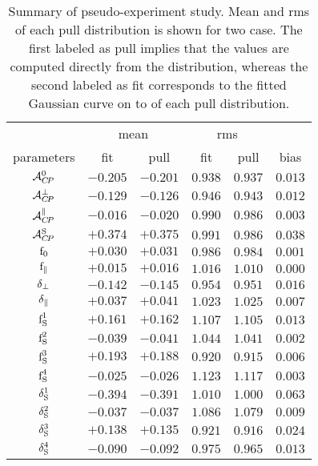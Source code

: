 \begin{table}[!t]
  \centering
  \footnotesize
  \begin{tabular}{c c c c c | c}
    \cline{2-5}
               & \multicolumn{2}{c}{mean} & \multicolumn{2}{c}{rms} &  \\
    \cline{2-6}
    parameters & fit & pull & fit & pull & bias \\
    \cline{1-6}
    $                  \mathcal{A}_{C\!P}^{0}$ & $-0.205$ & $-0.201$ & $0.938$ & $0.937$  & $0.013$ \\
    $              \mathcal{A}_{C\!P}^{\perp}$ & $-0.129$ & $-0.126$ & $0.946$ & $0.943$  & $0.012$ \\
    $          \mathcal{A}_{C\!P}^{\parallel}$ & $-0.016$ & $-0.020$ & $0.990$ & $0.986$  & $0.003$ \\
    $                  \mathcal{A}_{C\!P}^{\rm S}$ & $+0.374$ & $+0.375$ & $0.991$ & $0.986$  & $0.038$ \\
    \hline
    $                   \text{f}_{0}$ & $+0.030$ & $+0.031$ & $0.986$ & $0.984$  & $0.001$ \\
    $           \text{f}_{\parallel}$ & $+0.015$ & $+0.016$ & $1.016$ & $1.010$  & $0.000$ \\
    $         \delta_{\perp}$ & $-0.142$ & $-0.145$ & $0.954$ & $0.951$  & $0.016$ \\
    $     \delta_{\parallel}$ & $+0.037$ & $+0.041$ & $1.023$ & $1.025$  & $0.007$ \\
    \hline
    $                   \text{f}_{\text{S}}^{1}$ & $+0.161$ & $+0.162$ & $1.107$ & $1.105$  & $0.013$ \\
    $                   \text{f}_{\text{S}}^{2}$ & $-0.039$ & $-0.041$ & $1.044$ & $1.041$  & $0.002$ \\
    $                   \text{f}_{\text{S}}^{3}$ & $+0.193$ & $+0.188$ & $0.920$ & $0.915$  & $0.006$ \\
    $                   \text{f}_{\text{S}}^{4}$ & $-0.025$ & $-0.026$ & $1.123$ & $1.117$  & $0.003$ \\
    $               \delta_{\text{S}}^{1}$ & $-0.394$ & $-0.391$ & $1.010$ & $1.000$  & $0.063$ \\
    $               \delta_{\text{S}}^{2}$ & $-0.037$ & $-0.037$ & $1.086$ & $1.079$  & $0.009$ \\
    $               \delta_{\text{S}}^{3}$ & $+0.138$ & $+0.135$ & $0.921$ & $0.916$  & $0.024$ \\
    $               \delta_{\text{S}}^{4}$ & $-0.090$ & $-0.092$ & $0.975$ & $0.965$  & $0.013$ \\
  \end{tabular}
  \caption{Summary of pseudo-experiment study. Mean and rms of each pull distribution is shown for two case.
           The first labeled as pull implies that the values are computed directly from the distribution,
           whereas the second labeled as fit corresponds to the fitted Gaussian curve on to of each pull distribution.}
  \label{pull_table}
\end{table}
